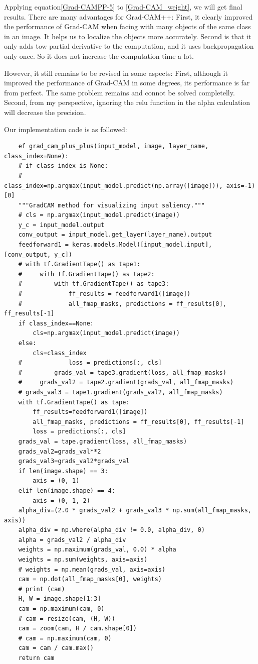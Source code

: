 \documentclass[conference]{IEEEtran}
\begin{document}
Applying equation\ref{Grad-CAMPP-5} to \ref{Grad-CAM_weight}, we will get final results.
There are many advantages for Grad-CAM++: First, it clearly improved the performance of Grad-CAM when facing with many objects of the same class in an image. It helps us to localize the objects more accurately. 
Second is that it only adds tow partial derivative to the computation, and it uses backpropagation only once. So it does not increase the computation time a lot.\par
However, it still remains to be revised in some aspects: First, although it improved the performance of Grad-CAM in some degrees, its performance is far from perfect. The same problem remains and connot be solved completelly. 
Second, from my perspective, ignoring the relu function in the alpha calculation will decrease the precision.\par
Our implementation code is as followed:
\begin{lstlisting}
    ef grad_cam_plus_plus(input_model, image, layer_name, class_index=None):
    # if class_index is None:
    #     class_index=np.argmax(input_model.predict(np.array([image])), axis=-1)[0]
    """GradCAM method for visualizing input saliency."""
    # cls = np.argmax(input_model.predict(image))
    y_c = input_model.output
    conv_output = input_model.get_layer(layer_name).output
    feedforward1 = keras.models.Model([input_model.input], [conv_output, y_c])
    # with tf.GradientTape() as tape1:
    #     with tf.GradientTape() as tape2:
    #         with tf.GradientTape() as tape3:
    #             ff_results = feedforward1([image])
    #             all_fmap_masks, predictions = ff_results[0], ff_results[-1]
    if class_index==None:
        cls=np.argmax(input_model.predict(image))
    else:
        cls=class_index
    #             loss = predictions[:, cls]
    #         grads_val = tape3.gradient(loss, all_fmap_masks)
    #     grads_val2 = tape2.gradient(grads_val, all_fmap_masks)
    # grads_val3 = tape1.gradient(grads_val2, all_fmap_masks)
    with tf.GradientTape() as tape:
        ff_results=feedforward1([image])
        all_fmap_masks, predictions = ff_results[0], ff_results[-1]
        loss = predictions[:, cls]
    grads_val = tape.gradient(loss, all_fmap_masks)
    grads_val2=grads_val**2
    grads_val3=grads_val2*grads_val
    if len(image.shape) == 3:
        axis = (0, 1)
    elif len(image.shape) == 4:
        axis = (0, 1, 2)
    alpha_div=(2.0 * grads_val2 + grads_val3 * np.sum(all_fmap_masks, axis))
    alpha_div = np.where(alpha_div != 0.0, alpha_div, 0)
    alpha = grads_val2 / alpha_div
    weights = np.maximum(grads_val, 0.0) * alpha
    weights = np.sum(weights, axis=axis)
    # weights = np.mean(grads_val, axis=axis)
    cam = np.dot(all_fmap_masks[0], weights)
    # print (cam)
    H, W = image.shape[1:3]
    cam = np.maximum(cam, 0)
    # cam = resize(cam, (H, W))
    cam = zoom(cam, H / cam.shape[0])
    # cam = np.maximum(cam, 0)
    cam = cam / cam.max()
    return cam
\end{lstlisting}
\end{document}
